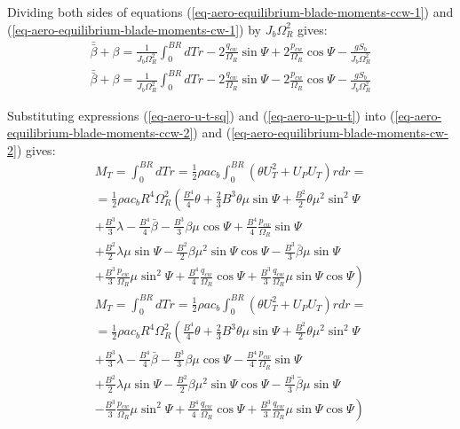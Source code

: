 Dividing both sides of equations (\ref{eq-aero-equilibrium-blade-moments-ccw-1}) and (\ref{eq-aero-equilibrium-blade-moments-cw-1}) by $J_b \Omega_R^2$ gives:
\begin{gather}
  \label{eq-aero-equilibrium-blade-moments-ccw-2}
  \bar{\bar \beta} + \beta
  = \frac{1}{ J_b \Omega_R^2 } \int_{0}^{BR} dT r
  - 2 \frac{q_{cw}}{\Omega_R} \sin \Psi
  + 2 \frac{p_{cw}}{\Omega_R} \cos \Psi
  - \frac{g S_b}{J_b \Omega_R^2} \\
  \label{eq-aero-equilibrium-blade-moments-cw-2}
    \bar{\bar \beta} + \beta
  = \frac{1}{ J_b \Omega_R^2 } \int_{0}^{BR} dT r
  - 2 \frac{q_{cw}}{\Omega_R} \sin \Psi
  - 2 \frac{p_{cw}}{\Omega_R} \cos \Psi
  - \frac{g S_b}{J_b \Omega_R^2}
\end{gather}

Substituting expressions (\ref{eq-aero-u-t-sq}) and (\ref{eq-aero-u-p-u-t}) into (\ref{eq-aero-equilibrium-blade-moments-ccw-2}) and (\ref{eq-aero-equilibrium-blade-moments-cw-2}) gives:
\begin{multline}
  \label{eq-aero-blade-moment-thrust-ccw}
  M_T =
  \int_{0}^{BR} dT r =
  \frac{1}{2} \rho a c_b
  \int_{0}^{BR} \left( \theta U_T^2 + U_P U_T \right) r dr = \\
  =
  \frac{1}{2} \rho a c_b R^4 \Omega_R^2
  \left(
    \frac{B^4}{4} \theta
  + \frac{2}{3} B^3 \theta \mu \sin \Psi
  + \frac{B^2}{2} \theta \mu^2 \sin^2 \Psi
  \right.
  \\
  + \frac{B^3}{3} \lambda
  - \frac{B^4}{4} \bar \beta
  - \frac{B^3}{3} \beta \mu \cos \Psi
  + \frac{B^4}{4} \frac{p_{cw}}{\Omega_R} \sin \Psi \\
  + \frac{B^2}{2} \lambda \mu \sin \Psi
  - \frac{B^2}{2} \beta \mu^2 \sin \Psi \cos \Psi
  - \frac{B^3}{3} \bar \beta \mu \sin \Psi
  \\
  \left.
  + \frac{B^3}{3} \frac{p_{cw}}{\Omega_R} \mu \sin^2 \Psi
  + \frac{B^4}{4} \frac{q_{cw}}{\Omega_R} \cos \Psi
  + \frac{B^3}{3} \frac{q_{cw}}{\Omega_R} \mu \sin \Psi \cos \Psi
  \right)
\end{multline}
\begin{multline}
  \label{eq-aero-blade-moment-thrust-cw}
  M_T =
  \int_{0}^{BR} dT r =
  \frac{1}{2} \rho a c_b
  \int_{0}^{BR} \left( \theta U_T^2 + U_P U_T \right) r dr = \\
  =
  \frac{1}{2} \rho a c_b R^4 \Omega_R^2
  \left(
    \frac{B^4}{4} \theta
  + \frac{2}{3} B^3 \theta \mu \sin \Psi
  + \frac{B^2}{2} \theta \mu^2 \sin^2 \Psi
  \right.
  \\
  + \frac{B^3}{3} \lambda
  - \frac{B^4}{4} \bar \beta
  - \frac{B^3}{3} \beta \mu \cos \Psi
  - \frac{B^4}{4} \frac{p_{cw}}{\Omega_R} \sin \Psi \\
  + \frac{B^2}{2} \lambda \mu \sin \Psi
  - \frac{B^2}{2} \beta \mu^2 \sin \Psi \cos \Psi
  - \frac{B^3}{3} \bar \beta \mu \sin \Psi
  \\
  \left.
  - \frac{B^3}{3} \frac{p_{cw}}{\Omega_R} \mu \sin^2 \Psi
  + \frac{B^4}{4} \frac{q_{cw}}{\Omega_R} \cos \Psi
  + \frac{B^3}{3} \frac{q_{cw}}{\Omega_R} \mu \sin \Psi \cos \Psi
  \right)
\end{multline}

